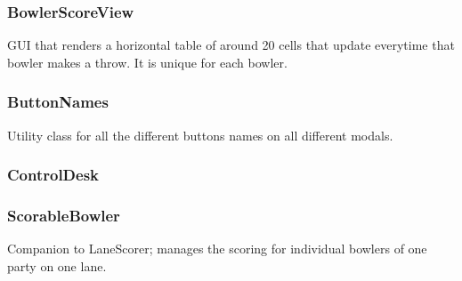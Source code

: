 \subsubsection{BowlerScoreView}
GUI that renders a horizontal table of around 20 cells that update everytime that bowler makes a throw. It is unique for each bowler.

\subsubsection{ButtonNames}
Utility class for all the different buttons names on all different modals.

\subsubsection{ControlDesk}


\subsubsection{ScorableBowler}
Companion to LaneScorer; manages the scoring for individual bowlers of one party on one lane.
